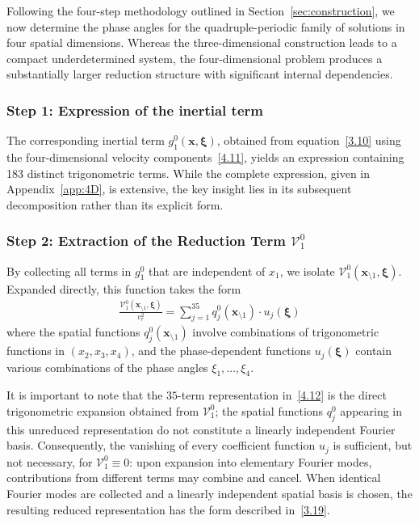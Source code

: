 \documentclass[11pt]{jfm}
\numberwithin{equation}{section}
\begin{document}
Following the four-step methodology outlined in
Section~\ref{sec:construction}, we now determine the phase angles for the
quadruple-periodic family of solutions in four spatial dimensions. Whereas the
three-dimensional construction leads to a compact underdetermined system, the
four-dimensional problem produces a substantially larger reduction structure with
significant internal dependencies.
\subsubsection{Step 1: Expression of the inertial term}
The corresponding inertial term $g_1^0(\boldsymbol{x}, \boldsymbol{\xi})$, obtained from equation~\eqref{3.10} using the four-dimensional velocity components~\eqref{4.11}, yields an expression containing 183 distinct trigonometric terms. While the complete expression, given in Appendix~\ref{app:4D}, is extensive, the key insight lies in its subsequent decomposition rather than its explicit form.
\subsubsection{Step 2: Extraction of the Reduction Term $\mathcal{V}_1^0$}
By collecting all terms in $g_1^0$ that are independent of $x_1$, we isolate
$\mathcal{V}_1^0(\boldsymbol{x}_{\setminus 1}, \boldsymbol{\xi})$. Expanded directly, this function
takes the form
\begin{eqnarray}
\label{4.12}
\frac{\mathcal{V}_1^0(\boldsymbol{x}_{\setminus 1}, \boldsymbol{\xi})}{v_r^2} = \sum_{j=1}^{35}
q_j^0(\boldsymbol{x}_{\setminus 1}) \cdot u_j(\boldsymbol{\xi})
\end{eqnarray}
where the spatial functions $q_j^0(\boldsymbol{x}_{\setminus 1})$ involve
combinations of trigonometric functions in $(x_2, x_3, x_4)$, and the phase-dependent
functions $u_j(\boldsymbol{\xi})$ contain various combinations of the phase
angles $\xi_1,\ldots,\xi_4$.

It is important to note that the $35$-term representation in~\eqref{4.12} is the direct
trigonometric expansion obtained from $\mathcal{V}_1^0$; the spatial functions $q_j^0$ appearing
in this unreduced representation do not constitute a linearly independent Fourier basis.
Consequently, the vanishing of every coefficient function $u_j$ is sufficient, but not necessary,
for $\mathcal{V}_1^0\equiv0$: upon expansion into elementary Fourier modes, contributions from
different terms may combine and cancel. When identical Fourier modes are collected and a linearly
independent spatial basis is chosen, the resulting reduced representation has the form described
in~\eqref{3.19}.
\end{document}
